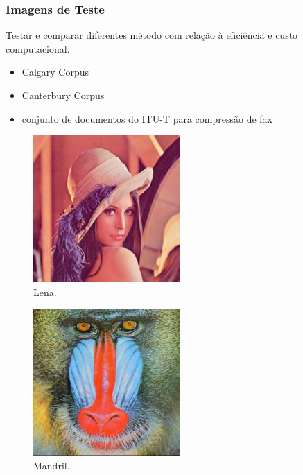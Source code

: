 \begin{frame}[allowframebreaks]
\frametitle{Imagens de Teste}
  Testar e comparar diferentes método com relação à eficiência e custo computacional.
  \begin{itemize}
  \item Calgary Corpus
  \item Canterbury Corpus
  \item conjunto de documentos do ITU-T para compressão de fax
  \end{itemize}

  \framebreak
  \begin{figure}[h!]
  \centering
  \includegraphics[width=0.5\textwidth]{images/lena_color.jpg}
  \caption{Lena.}
  \label{fig:lena_color}
  \end{figure}
  \framebreak

  \begin{figure}[h!]
  \centering
  \includegraphics[width=0.5\textwidth]{images/mandril.jpg}
  \caption{Mandril.}
  \label{fig:mandril}
  \end{figure}

  \framebreak


\end{frame}
